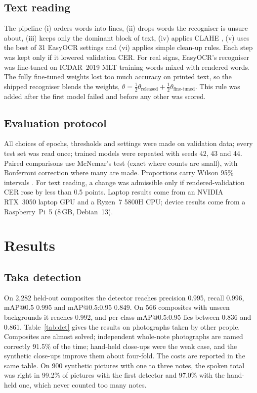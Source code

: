 \documentclass[preprint,12pt]{elsarticle}
\begin{document}
\subsection{Text reading}
\label{sec:m_ocr}
The pipeline (i) orders words into lines, (ii) drops words the recogniser is unsure about, (iii) keeps only the dominant block of text, (iv) applies CLAHE \cite{clahe}, (v) uses the best of 31 EasyOCR settings and (vi) applies simple clean-up rules. Each step was kept only if it lowered validation CER. For real signs, EasyOCR's recogniser was fine-tuned on ICDAR~2019 MLT training words mixed with rendered words. The fully fine-tuned weights lost too much accuracy on printed text, so the shipped recogniser blends the weights, $\theta=\tfrac12\theta_{\mathrm{released}}+\tfrac12\theta_{\mathrm{fine\text{-}tuned}}$. This rule was added after the first model failed and before any other was scored.

\subsection{Evaluation protocol}
\label{sec:protocol}
All choices of epochs, thresholds and settings were made on validation data; every test set was read once; trained models were repeated with seeds 42, 43 and 44. Paired comparisons use McNemar's test \cite{mcnemar1947} (exact where counts are small), with Bonferroni correction where many are made. Proportions carry Wilson 95\% intervals \cite{wilson1927}. For text reading, a change was admissible only if rendered-validation CER rose by less than 0.5 points. Laptop results come from an NVIDIA RTX~3050 laptop GPU and a Ryzen~7 5800H CPU; device results come from a Raspberry~Pi~5 (8\,GB, Debian~13).

\section{Results}
\label{sec:results}

\subsection{Taka detection}
\label{sec:res_det}
On 2,282 held-out composites the detector reaches precision 0.995, recall 0.996, mAP@0.5 0.995 and mAP@0.5:0.95 0.849. On 566 composites with unseen backgrounds it reaches 0.992, and per-class mAP@0.5:0.95 lies between 0.836 and 0.861. Table~\ref{tab:det} gives the results on photographs taken by other people. Composites are almost solved; independent whole-note photographs are named correctly 91.5\% of the time; hand-held close-ups were the weak case, and the synthetic close-ups improve them about four-fold. The costs are reported in the same table. On 900 synthetic pictures with one to three notes, the spoken total was right in 99.2\% of pictures with the first detector and 97.0\% with the hand-held one, which never counted too many notes.
\end{document}
